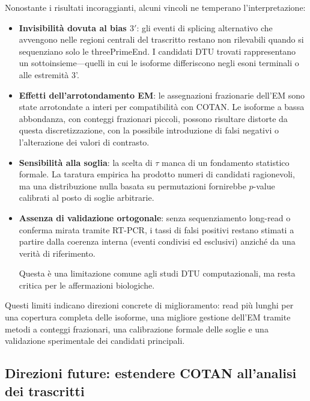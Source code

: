 Nonostante i risultati incoraggianti, alcuni vincoli ne temperano l'interpretazione:
\begin{itemize}
    \item \textbf{Invisibilità dovuta al bias $3'$}: gli eventi di splicing alternativo che avvengono nelle regioni centrali del trascritto restano non rilevabili quando si sequenziano solo le \gls{threePrimeEnd}. I candidati DTU trovati rappresentano un sottoinsieme---quelli in cui le isoforme differiscono negli esoni terminali o alle estremità 3'.

    \item \textbf{Effetti dell'arrotondamento EM}: le assegnazioni frazionarie dell'EM sono state arrotondate a interi per compatibilità con COTAN. Le isoforme a bassa abbondanza, con conteggi frazionari piccoli, possono risultare distorte da questa discretizzazione, con la possibile introduzione di falsi negativi o l'alterazione dei valori di contrasto.

    \item \textbf{Sensibilità alla soglia}: la scelta di $\tau$ manca di un fondamento statistico formale. La taratura empirica ha prodotto numeri di candidati ragionevoli, ma una distribuzione nulla basata su permutazioni fornirebbe $p$-value calibrati al posto di soglie arbitrarie.

    \item \textbf{Assenza di validazione ortogonale}: senza sequenziamento long-read o conferma mirata tramite RT-PCR, i tassi di falsi positivi restano stimati a partire dalla coerenza interna (eventi condivisi ed esclusivi) anziché da una verità di riferimento.

Questa è una limitazione comune agli studi DTU computazionali, ma resta critica per le affermazioni biologiche.
\end{itemize}

Questi limiti indicano direzioni concrete di miglioramento: read più lunghi per una copertura completa delle isoforme, una migliore gestione dell'EM tramite metodi a conteggi frazionari, una calibrazione formale delle soglie e una validazione sperimentale dei candidati principali.

\subsection*{Direzioni future: estendere COTAN all'analisi dei trascritti}

